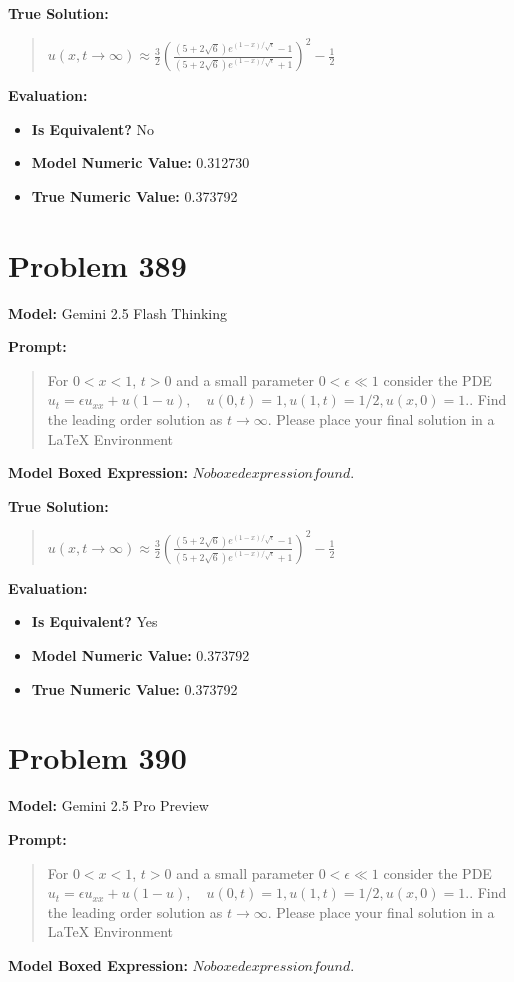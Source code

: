 \documentclass{article}
\begin{document}
{\textbf{True Solution:}
\begin{quote}
$u(x,t \to \infty) \approx \frac{3}{2} \left(\frac{(5+2\sqrt{6}) e^{(1-x)/\sqrt{\epsilon}} - 1}{(5+2\sqrt{6}) e^{(1-x)/\sqrt{\epsilon}} + 1}\right)^2 - \frac{1}{2}$
\end{quote}

\textbf{Evaluation:}
\begin{itemize}
\item \textbf{Is Equivalent?} No
\item \textbf{Model Numeric Value:} 0.312730
\item \textbf{True Numeric Value:} 0.373792
\end{itemize}
\vspace{1cm}
\section*{Problem 389}
\textbf{Model:} Gemini 2.5 Flash Thinking

\textbf{Prompt:}
\begin{quote}
For $0 < x < 1$, $t > 0$ and a small parameter $0 < \epsilon \ll 1$ consider the PDE $u_t = \epsilon u_{xx} + u(1-u), \quad u(0, t) = 1, u(1, t) = 1/2, u(x, 0) =1.$. Find the leading order solution as $t \to \infty$. Please place your final solution in a $\boxed{}$ LaTeX Environment
\end{quote}
\textbf{Model Boxed Expression:} $No boxed expression found.$

\textbf{True Solution:}
\begin{quote}
$u(x,t \to \infty) \approx \frac{3}{2} \left(\frac{(5+2\sqrt{6}) e^{(1-x)/\sqrt{\epsilon}} - 1}{(5+2\sqrt{6}) e^{(1-x)/\sqrt{\epsilon}} + 1}\right)^2 - \frac{1}{2}$
\end{quote}

\textbf{Evaluation:}
\begin{itemize}
\item \textbf{Is Equivalent?} Yes
\item \textbf{Model Numeric Value:} 0.373792
\item \textbf{True Numeric Value:} 0.373792
\end{itemize}
\vspace{1cm}
\section*{Problem 390}
\textbf{Model:} Gemini 2.5 Pro Preview

\textbf{Prompt:}
\begin{quote}
For $0 < x < 1$, $t > 0$ and a small parameter $0 < \epsilon \ll 1$ consider the PDE $u_t = \epsilon u_{xx} + u(1-u), \quad u(0, t) = 1, u(1, t) = 1/2, u(x, 0) =1.$. Find the leading order solution as $t \to \infty$. Please place your final solution in a $\boxed{}$ LaTeX Environment
\end{quote}
\textbf{Model Boxed Expression:} $No boxed expression found.$

}
\end{document}

